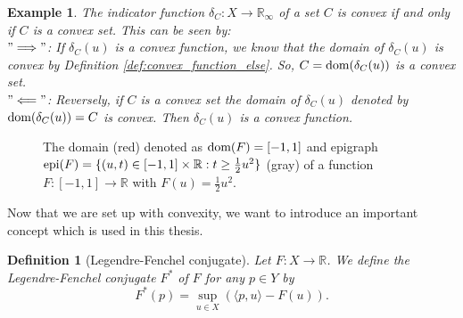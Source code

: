 \documentclass[abstracton]{scrreprt}
\newtheorem{definition}[theorem]{Definition}
\newtheorem{example}[theorem]{Example}
\begin{document}
        \begin{example}
            \label{ex:convex_function_reloaded}
            The indicator function $\delta_{C}: X \to \mathbb{R}_{\infty}$ of a set $C$ is convex if and only if $C$ is a convex set. This can be seen by:\\
            $"\Longrightarrow"$: If $\delta_{C}(u)$ is a convex function, we know that the domain of $\delta_{C}(u)$ is convex by Definition \ref{def:convex_function_else}. So, $C = \textnormal{dom}(\delta_{C}(u))$ is a convex set.\\
            $"\Longleftarrow"$: Reversely, if $C$ is a convex set the domain of $\delta_{C}(u)$ denoted by $\textnormal{dom}(\delta_{C}(u)) = C$ is convex. Then $\delta_{C}(u)$ is a convex function.
        \end{example}
        \begin{figure}[!ht]
            \centering
            \caption[Domain and Epigraph.]{The domain (red) denoted as $\textnormal{dom}(F) = [-1, 1]$ and epigraph \\$\textnormal{epi}(F) = \{(u, t) \in [-1, 1] \times \mathbb{R} : t \ge \frac{1}{2}u^{2}\}$ (gray) of a function $F: [-1, 1] \longrightarrow \mathbb{R}$ with $F(u) = \frac{1}{2}u^{2}$.}
            \label{fig:domain_epigraph}
        \end{figure}
        Now that we are set up with convexity, we want to introduce an important concept which is used in this thesis.
        \begin{definition}[Legendre-Fenchel conjugate] %
        \label{def:legendre_fenchel_conjugate}
            Let $F: X \longrightarrow \mathbb{R}$. We define the Legendre-Fenchel conjugate $F^{\ast}$ of $F$ for any $p \in Y$ by
                \begin{equation}
                    F^{\ast}(p) = \sup_{u \in X} \left( \langle p, u \rangle - F(u) \right).
                    \label{eq:legendre_fenchel_conjugate}
                \end{equation}
        \end{definition}
\end{document}
